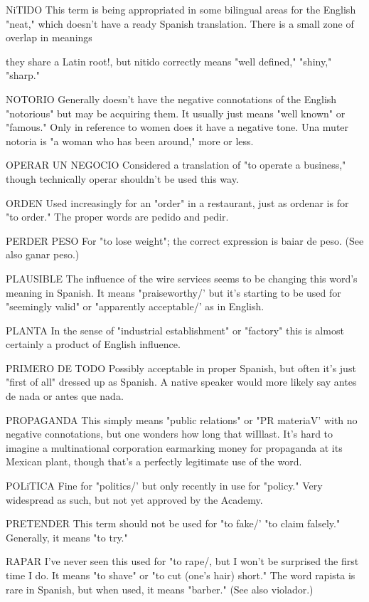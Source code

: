 NiTIDO This term is being appropriated in some bilingual
areas for the English "neat," which doesn't have a ready Spanish translation. There is a small zone of overlap in meanings {they share a Latin
root!, but nitido correctly means "well defined," "shiny," "sharp."

NOTORIO Generally doesn't have the negative connotations
of the English "notorious" but may be acquiring them. It usually just
means "well known" or "famous." Only in reference to women does it
have a negative tone. Una muter notoria is "a woman who has been
around," more or less.

OPERAR UN NEGOCIO Considered a translation of "to operate a business," though technically operar shouldn't be used this way.

ORDEN Used increasingly for an "order" in a restaurant, just
as ordenar is for "to order." The proper words are pedido and pedir.

PERDER PESO For "to lose weight"; the correct expression is
baiar de peso. (See also ganar peso.)

PLAUSIBLE The influence of the wire services seems to be
changing this word's meaning in Spanish. It means "praiseworthy/' but
it's starting to be used for "seemingly valid" or "apparently acceptable/' as in English.

PLANTA In the sense of "industrial establishment" or "factory" this is almost certainly a product of English influence.

PRIMERO DE TODO Possibly acceptable in proper Spanish,
but often it's just "first of all" dressed up as Spanish. A native speaker
would more likely say antes de nada or antes que nada.

PROPAGANDA This simply means "public relations" or "PR
materiaV' with no negative connotations, but one wonders how long
that wiIllast. It's hard to imagine a multinational corporation earmarking money for propaganda at its Mexican plant, though that's
a perfectly legitimate use of the word.

POLiTICA Fine for "politics/' but only recently in use for "policy." Very widespread as such, but not yet approved by the Academy.

PRETENDER This term should not be used for "to fake/' "to
claim falsely." Generally, it means "to try."

RAPAR I've never seen this used for "to rape/, but I won't be
surprised the first time I do. It means "to shave" or "to cut (one's hair)
short." The word rapista is rare in Spanish, but when used, it means
"barber." (See also violador.)

}

